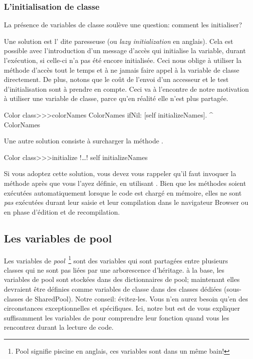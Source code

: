 \documentclass[a4paper,10pt,twoside]{book}
\begin{document}
\subsubsection{L'initialisation de classe}

La présence de variables de classe soulève une question: comment les initialiser?

Une solution est l' dite paresseuse (ou \emph{lazy initialization} en anglais).
Cela est possible avec l'introduction d'un message d'accès qui
initialise la variable, durant l'exécution, si celle-ci n'a pas été
encore initialisée.
Ceci nous oblige à utiliser la méthode d'accès tout le temps et à ne jamais
faire appel à la variable de classe directement.
De plus, notons que le coût de l'envoi d'un accesseur et le test d'initialisation sont à prendre en compte.
Ceci va à l'encontre de notre motivation à utiliser une variable de classe, parce qu'en réalité elle n'est plus partagée.

\begin{method}[colorclasscolornames]{}
Color class>>>colorNames	
	ColorNames ifNil: [self initializeNames].
	^ ColorNames
\end{method}	

Une autre solution consiste à surcharger la méthode .

\begin{method}[colorclassinit]{}
Color class>>>initialize	
	!\ldots!
	self initializeNames
\end{method}

\noindent
Si vous adoptez cette solution, vous devez vous rappeler qu'il faut
invoquer la méthode  après que vous l'ayez définie,
\eg en utilisant .
Bien que les méthodes   soient exécutées automatiquement lorsque le code est chargé en mémoire,
elles ne sont \emph{pas} exécutées durant leur saisie et leur compilation dans le navigateur Browser ou en phase d'édition et de recompilation.

\subsection{Les variables de pool}
Les variables de \emph{pool}~\footnote{Pool signifie piscine en anglais, ces variables sont dans un même bain!} sont des variables qui sont partagées entre plusieurs classes qui ne sont pas liées par une arborescence d'héritage.
à la base, les variables de pool sont stockées dans des dictionnaires
de pool;  maintenant elles devraient être définies comme variables
de classe dans des classes dédiées (sous-classes de SharedPool).
Notre conseil: évitez-les. Vous n'en aurez besoin qu'en des circonstances
exceptionnelles et spécifiques.
Ici, notre but est de vous expliquer suffisamment les variables de
 pour comprendre leur fonction quand vous les
rencontrez durant la lecture de code.
\end{document}
